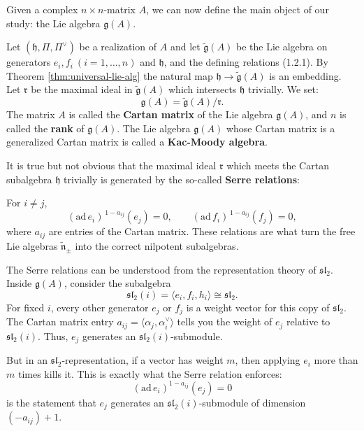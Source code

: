 \documentclass[12pt]{article}
\begin{document}
Given a complex $n \times n$-matrix $A$, we can now define the main object
of our study: the Lie algebra $\mathfrak{g}(A)$.
\begin{definition}
    Let $(\mathfrak{h}, \Pi, \Pi^\vee)$ be a realization of $A$ and let
    $\tilde{\mathfrak{g}}(A)$ be the Lie algebra on generators
    $e_i, f_i \ (i=1,\dots,n)$ and $\mathfrak{h}$, and the defining relations
    (1.2.1). By Theorem \ref{thm:universal-lie-alg} the natural map
    $\mathfrak{h} \to \tilde{\mathfrak{g}}(A)$ is an embedding. Let $\mathfrak{r}$
    be the maximal ideal in $\tilde{\mathfrak{g}}(A)$ which intersects
    $\mathfrak{h}$ trivially. We set:
    \[
        \mathfrak{g}(A) = \tilde{\mathfrak{g}}(A)/\mathfrak{r}.
    \]
    The matrix $A$ is called the \textbf{Cartan matrix} of the Lie algebra $\mathfrak{g}(A)$, and $n$ is called the \textbf{rank} of $\mathfrak{g}(A)$. The Lie algebra $\mathfrak{g}(A)$ whose Cartan matrix is a generalized Cartan matrix is called a \textbf{Kac-Moody algebra}.
\end{definition}

\begin{remark}
    It is true but not obvious that the maximal ideal $\mathfrak{r}$ which meets the Cartan subalgebra $\mathfrak{h}$ trivially is generated by the so-called \textbf{Serre relations}:


    For $i \neq j$,
    \[
        (\mathrm{ad}\, e_i)^{\,1-a_{ij}}(e_j) = 0, \qquad
        (\mathrm{ad}\, f_i)^{\,1-a_{ij}}(f_j) = 0,
    \]
    where $a_{ij}$ are entries of the Cartan matrix.
    These relations are what turn the free Lie algebras $\tilde{\mathfrak{n}}_\pm$ into the correct nilpotent subalgebras.

    The Serre relations can be understood from the representation theory of $\mathfrak{sl}_2$. Inside $\mathfrak{g}(A)$, consider the subalgebra
    \[
        \mathfrak{sl}_2(i) = \langle e_i, f_i, h_i \rangle \cong \mathfrak{sl}_2.
    \]
    For fixed $i$, every other generator $e_j$ or $f_j$ is a weight vector for this copy of $\mathfrak{sl}_2$. The Cartan matrix entry $a_{ij} = \langle \alpha_j, \alpha_i^\vee \rangle$ tells you the weight of $e_j$ relative to $\mathfrak{sl}_2(i)$. Thus, $e_j$ generates an $\mathfrak{sl}_2(i)$-submodule.

    But in an $\mathfrak{sl}_2$-representation, if a vector has weight $m$, then applying $e_i$ more than $m$ times kills it. This is exactly what the Serre relation enforces:
    \[
        (\mathrm{ad}\, e_i)^{1-a_{ij}}(e_j) = 0
    \]
    is the statement that $e_j$ generates an $\mathfrak{sl}_2(i)$-submodule of dimension $(-a_{ij})+1$.
\end{remark}
\end{document}
